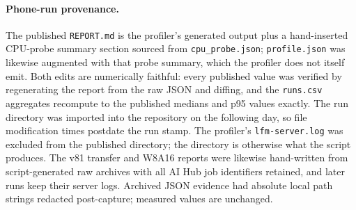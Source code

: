 \documentclass[10pt,twocolumn,letterpaper]{article}
\begin{document}
\paragraph{Phone-run provenance.}
The published \texttt{REPORT.md} is the profiler's generated output plus a
hand-inserted CPU-probe summary section sourced from \texttt{cpu\_probe.json};
\texttt{profile.json} was likewise augmented with that probe summary, which the
profiler does not itself emit. Both edits are numerically faithful: every
published value was verified by regenerating the report from the raw JSON and
diffing, and the \texttt{runs.csv} aggregates recompute to the published
medians and p95 values exactly. The run directory was imported into the
repository on the following day, so file modification times postdate the run
stamp. The profiler's \texttt{lfm-server.log} was excluded from the published
directory; the directory is otherwise what the script produces. The v81
transfer and W8A16 reports were likewise hand-written from script-generated
raw archives with all AI Hub job identifiers retained, and later runs keep
their server logs. Archived JSON evidence had absolute local path strings
redacted post-capture; measured values are unchanged.
\end{document}
